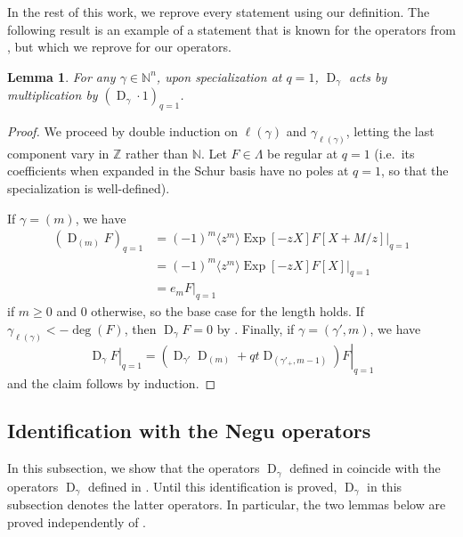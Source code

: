 \documentclass[reqno]{amsart}
\theoremstyle{plain}
\newtheorem{lemma}[theorem]{Lemma}
\theoremstyle{definition}
\theoremstyle{remark}
\DeclareMathOperator{\D}{D}
\DeclareMathOperator{\Exp}{Exp}
\newcommand{\<}{\langle}
\renewcommand{\>}{\rangle}
\begin{document}
In the rest of this work, we reprove every statement using our definition. The following result is an example of a statement that is known for the operators from \cite{BHMPS2023ShuffleAnyLine}, but which we reprove for our operators.

\begin{lemma}
    \label{lem:Dgamma_q1}
    For any $\gamma \in \mathbb{N}^n$, upon specialization at $q=1$, $\D_\gamma$ acts by multiplication by $\left( \D_\gamma \cdot 1 \right)_{q=1} $.
\end{lemma}

\begin{proof}
    We proceed by double induction on $\ell(\gamma)$ and $\gamma_{\ell(\gamma)}$, letting the last component vary in $\mathbb{Z}$ rather than $\mathbb{N}$. Let $F \in \Lambda$ be regular at $q=1$ (i.e.\ its coefficients when expanded in the Schur basis have no poles at $q=1$, so that the specialization is well-defined).
    
    If $\gamma = (m)$, we have
    \begin{align*}
        \left( \D_{(m)} F \right)_{q=1} & = (-1)^m \langle z^m \rangle \Exp[-zX] F[X + M/z] \rvert_{q=1} \\
        & = (-1)^m \langle z^m \rangle \Exp[-zX] F[X] \rvert_{q=1} \\
        & = e_m F \rvert_{q=1}
    \end{align*}
    if $m \geq 0$ and $0$ otherwise, so the base case for the length holds. If $\gamma_{\ell(\gamma)} < - \deg(F)$, then $\D_\gamma F = 0$ by . Finally, if $\gamma = (\gamma', m)$, we have
    \[ \left. \D_\gamma F \right\rvert_{q=1} = \left. \left( \D_{\gamma'} \D_{(m)} + qt \D_{(\gamma'_+, m-1)} \right) F \right\rvert_{q=1} \]
    and the claim follows by induction.
\end{proof}


\subsection{Identification with the \texorpdfstring{Negu}{Negut} operators}

In this subsection, we show that the operators $\D_\gamma$ defined in  coincide with the operators $\D_\gamma$ defined in \cite[Equation~(52)]{BHMPS2023ShuffleAnyLine}.
Until this identification is proved, $\D_\gamma$ in this subsection denotes the latter operators. In particular, the two lemmas below are proved independently of .
\end{document}
